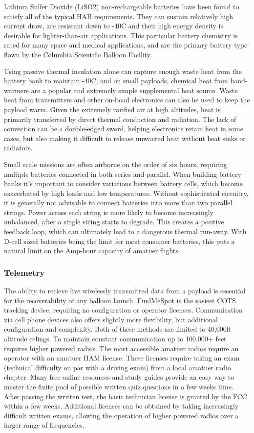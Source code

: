 \documentclass[heading.tex]{subfiles}
\begin{document}
Lithium Sulfer Dioxide (LiSO2) non-rechargeable batteries have been found to 
satisfy all of the typical HAB requirements. They can sustain relatively high
current draw, are resistant down to -40\degree C and their high energy density
is desirable for lighter-than-air applications.
This particular battery chemistry is rated for many space and
medical applications, and are the primary battery type flown by the Columbia
Scientific Balloon Facility.

Using passive thermal insulation alone can capture enough waste heat from the
battery bank to maintain -40\degree C, and on small payloads, chemical heat
from hand-warmers are a popular and extremely simple supplemental heat source.
Waste heat from transmitters and other on-boad electronics can also be used to
keep the payload warm. Given the extremely rarified air at high altitudes,
heat is primarily transferred by direct thermal conduction and radiation.
The lack of convection can be a double-edged sword, helping electronics retain
heat in some cases, but also making it difficult to release unwanted heat
without heat sinks or radiators.

Small scale missions are often airborne on the order of six hours,
requiring multiple batteries connected in both series and parallel.
When building battery banks it's important to consider variations between
battery cells, which become exacerbated by high loads and low temperatures.
Without sophisticated circuitry, it is generally not advisable to connect
batteries into more than two parallel strings. Power across each string is more
likely to become increasingly unbalanced, after a single string starts to degrade.
This creates a positive feedback loop, which can ultimately lead to a dangerous
thermal run-away. With D-cell sized batteries being the limit for most consumer
batteries, this puts a natural limit on the Amp-hour capacity of amatuer flights.


\subsubsection{Telemetry}

The ability to recieve live wirelessly transmitted data from a payload is
essential for the recoverability of any balloon launch. FindMeSpot is the easiest
COTS tracking device, requiring no configuration or operator licenses.
Communication via cell phone devices also offers slightly more flexibility,
but additional configuration and complexity.
Both of these methods are limited to 40,000ft altitude celings.
To maintain constant communication up to 100,000+ feet requires higher powered radios.
The most accessible amatuer radios require an operator with an amatuer HAM license.
These licenses require taking an exam (technical difficulty on par with a
driving exam) from a local amatuer radio chapter. Many free online resources and study
guides provide an easy way to master the finite pool of possible written quiz
questions in a few weeks time. After passing the written test, the basic
technician license is granted by the FCC within a few weeks. Additional licenses
can be obtained by taking increasingly difficult written exams, allowing the
operation of higher powered radios over a larger range of frequencies.
\end{document}
